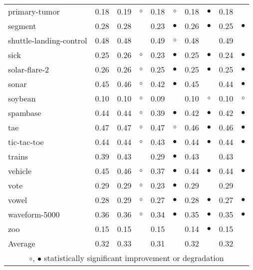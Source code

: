 {\begin{longtable}{lrr@{\hspace{0.1cm}}cr@{\hspace{0.1cm}}cr@{\hspace{0.1cm}}cr@{\hspace{0.1cm}}c}
primary-tumor & 0.18 & 0.19 &   $\circ$ & 0.18 &   $\circ$ & 0.18 & $\bullet$ & 0.18 &           \\
segment & 0.28 & 0.28 &           & 0.23 & $\bullet$ & 0.26 & $\bullet$ & 0.25 &  $\bullet$\\
shuttle-landing-control & 0.48 & 0.48 &           & 0.49 &   $\circ$ & 0.48 &           & 0.49 &           \\
sick & 0.25 & 0.26 &   $\circ$ & 0.23 & $\bullet$ & 0.25 & $\bullet$ & 0.24 &  $\bullet$\\
solar-flare-2 & 0.26 & 0.26 &   $\circ$ & 0.25 & $\bullet$ & 0.25 & $\bullet$ & 0.25 &  $\bullet$\\
sonar & 0.45 & 0.46 &   $\circ$ & 0.42 & $\bullet$ & 0.45 &           & 0.44 &  $\bullet$\\
soybean & 0.10 & 0.10 &   $\circ$ & 0.09 &           & 0.10 &   $\circ$ & 0.10 &    $\circ$\\
spambase & 0.44 & 0.44 &   $\circ$ & 0.39 & $\bullet$ & 0.42 & $\bullet$ & 0.42 &  $\bullet$\\
tae & 0.47 & 0.47 &   $\circ$ & 0.47 &   $\circ$ & 0.46 & $\bullet$ & 0.46 &  $\bullet$\\
tic-tac-toe & 0.44 & 0.44 &   $\circ$ & 0.43 & $\bullet$ & 0.44 & $\bullet$ & 0.44 &  $\bullet$\\
trains & 0.39 & 0.43 &           & 0.29 & $\bullet$ & 0.43 &           & 0.43 &           \\
vehicle & 0.45 & 0.46 &   $\circ$ & 0.37 & $\bullet$ & 0.44 & $\bullet$ & 0.44 &  $\bullet$\\
vote & 0.29 & 0.29 &   $\circ$ & 0.23 & $\bullet$ & 0.29 &           & 0.29 &           \\
vowel & 0.28 & 0.29 &   $\circ$ & 0.27 & $\bullet$ & 0.28 & $\bullet$ & 0.27 &  $\bullet$\\
waveform-5000 & 0.36 & 0.36 &   $\circ$ & 0.34 & $\bullet$ & 0.35 & $\bullet$ & 0.35 &  $\bullet$\\
zoo & 0.15 & 0.15 &           & 0.15 &           & 0.14 & $\bullet$ & 0.15 &           \\
\hline
Average & 0.32 & 0.33 &           & 0.31 &           & 0.32 &           & 0.32 &           \\
\hline
\multicolumn{10}{c}{$\circ$, $\bullet$ statistically significant improvement or degradation}\\
\end{longtable} \footnotesize \par}